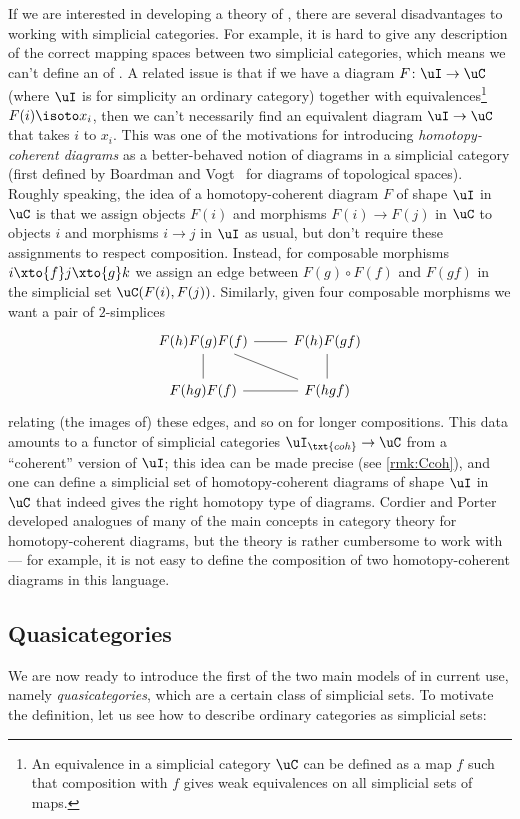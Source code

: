 \documentclass[a4paper,12pt]{article}
\begin{document}
If we are interested in developing a theory of \icats{}, there are
several disadvantages to working with simplicial categories. For
example, it is hard to give any description of the correct mapping
spaces between two simplicial categories, which means we can't define
an \icat{} of \icats{}. A related issue is that if we have a diagram
$F \colon \uI \to \uC$ (where $\uI$ is for simplicity an ordinary
category) together with equivalences\footnote{An equivalence in a
  simplicial category $\uC$ can be defined as a map $f$ such that
  composition with $f$ gives weak equivalences on all simplicial sets
  of maps.} $F(i) \isoto x_{i}$, then we can't necessarily find an
equivalent diagram $\uI \to \uC$ that takes $i$ to $x_{i}$. This was
one of the motivations for introducing \emph{homotopy-coherent
  diagrams} as a better-behaved notion of diagrams in a simplicial
category (first defined by Boardman and Vogt~\cite{BoardmanVogt} for
diagrams of topological spaces). Roughly speaking, the idea of a
homotopy-coherent diagram $F$ of shape $\uI$ in $\uC$ is that we
assign objects $F(i)$ and morphisms $F(i) \to F(j)$ in $\uC$ to
objects $i$ and morphisms $i \to j$ in $\uI$ as usual, but don't
require these assignments to respect composition. Instead, for
composable morphisms $i \xto{f} j \xto{g} k$ we assign an edge between
$F(g) \circ F(f)$ and $F(gf)$ in the simplicial set
$\uC(F(i),F(j))$. Similarly, given four composable morphisms we want a
pair of $2$-simplices
\[
  \begin{tikzcd}
    F(h)F(g)F(f) \ar[d, no head] \ar[dr, no head] \ar[r, no head] & F(h)F(gf) \ar[d,no head] \\
    F(hg)F(f) \ar[r, no head] & F(hgf)
  \end{tikzcd}
\]
relating (the images of) these edges, and so on for longer
compositions. This data amounts to a functor of simplicial categories
$\uI_{\txt{coh}} \to \uC$ from a ``coherent'' version of $\uI$; this
idea can be made precise (see \cref{rmk:Ccoh}), and one can define a
simplicial set of homotopy-coherent diagrams of shape $\uI$ in $\uC$
that indeed gives the right homotopy type of diagrams. Cordier and
Porter~\cite{CordierPorter} developed analogues of many of the main
concepts in category theory for homotopy-coherent diagrams, but the
theory is rather cumbersome to work with --- for example, it is not
easy to define the composition of two homotopy-coherent diagrams in
this language.

\subsection{Quasicategories}\label{subsec:qcat}
We are now ready to introduce the first of the two main models of
\icats{} in current use, namely \emph{quasicategories}, which are a
certain class of simplicial sets. To motivate the definition, let us
see how to describe ordinary categories as simplicial sets:
\end{document}
